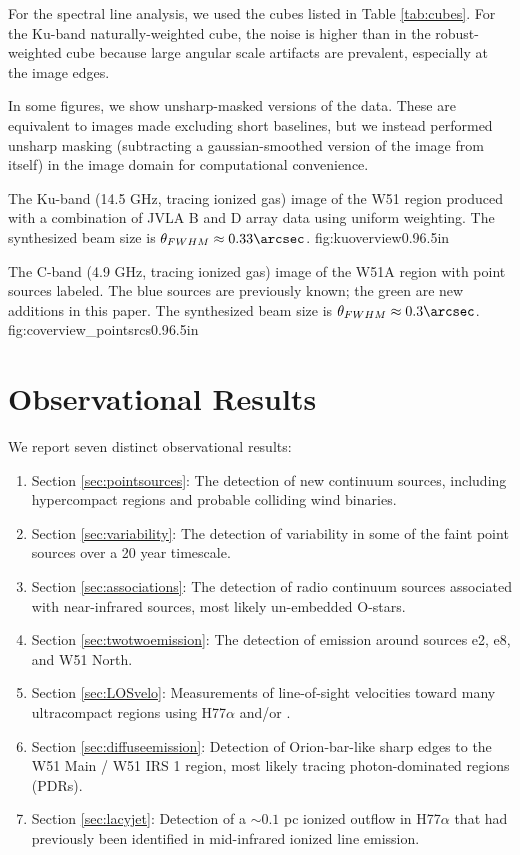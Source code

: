 For the spectral line analysis, we used the cubes listed in Table
\ref{tab:cubes}.  For the Ku-band naturally-weighted cube, the noise is higher
than in the robust-weighted cube because large angular scale artifacts are
prevalent, especially at the image edges.

In some figures, we show unsharp-masked versions of the data.  These are
equivalent to images made excluding short baselines, but we instead performed
unsharp masking (subtracting a gaussian-smoothed version of the image from
itself) in the image domain for computational convenience.



{The Ku-band (14.5 GHz, tracing ionized gas) image of the W51 region produced
with a combination of JVLA B and D array data using uniform weighting.  The
synthesized beam size is
$\theta_{FWHM}\approx0.33\arcsec$.}
{fig:kuoverview}{0.9}{6.5in}

{The C-band (4.9 GHz, tracing ionized gas) image of the W51A region with point sources labeled.  The
blue sources are previously known; the green are new additions in this paper.
The synthesized beam size is $\theta_{FWHM}\approx0.3\arcsec$.
}
{fig:coverview_pointsrcs}{0.9}{6.5in}


\section{Observational Results}
\label{sec:results}
We report seven distinct observational results: 
\begin{enumerate}
    \item Section \ref{sec:pointsources}: The detection of new continuum
        sources, including hypercompact \hii regions and probable
        colliding wind binaries. 
    \item Section \ref{sec:variability}: The detection of variability in
        some of the faint point sources over a 20 year timescale.
    \item Section \ref{sec:associations}: The detection of radio continuum
        sources associated with near-infrared sources, most likely un-embedded
        O-stars.
    \item Section \ref{sec:twotwoemission}: The detection of \formaldehyde
        \twotwo emission around sources e2, e8, and W51 North.
    \item Section \ref{sec:LOSvelo}: Measurements of line-of-sight velocities
        toward many ultracompact \hii regions using H77$\alpha$ and/or
        \formaldehyde.
    \item Section \ref{sec:diffuseemission}: Detection of Orion-bar-like sharp
        edges to the W51 Main / W51 IRS 1 \hii region, most likely tracing 
        photon-dominated regions (PDRs).
    \item Section \ref{sec:lacyjet}: Detection of a $\sim0.1$ pc ionized
        outflow in H77$\alpha$ that had previously been identified in
        mid-infrared ionized line emission.
\end{enumerate}

